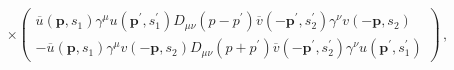 \begin{equation}
\times \left( 
\begin{array}{c}
\overline{u}\left( \mathbf{p},s_{1}\right) \gamma ^{\mu }u\left( \mathbf{p}%
^{\prime },s_{1}^{\prime }\right) D_{\mu \nu }(p-p^{\prime })\overline{v}%
\left( -\mathbf{p}^{\prime },s_{2}^{\prime }\right) \gamma ^{\nu }v\left( -%
\mathbf{p,}s_{2}\right)  \\ 
-\overline{u}\left( \mathbf{p},s_{1}\right) \gamma ^{\mu }v\left( -\mathbf{p,%
}s_{2}\right) D_{\mu \nu }\left( p+p^{\prime }\right) \overline{v}\left( -\mathbf{p}%
^{\prime },s_{2}^{\prime }\right) \gamma ^{\nu }u\left( \mathbf{p}^{\prime
},s_{1}^{\prime }\right)  
\end{array}
\right)\, , 
\end{equation}


